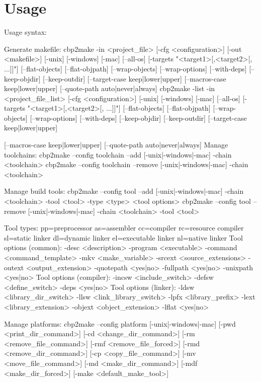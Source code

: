 \hypertarget{index_sec_usage}{}\section{Usage}\label{index_sec_usage}
{\ttfamily  
\begin{DoxyVerbInclude}
Usage syntax:

	Generate makefile:
		cbp2make -in <project_file> [-cfg <configuration>] [-out <makefile>]
			 [-unix] [-windows] [-mac] [--all-os] [-targets "<target1>[,<target2>[, ...]]"]
			 [--flat-objects] [--flat-objpath] [--wrap-objects] [--wrap-options]
			 [--with-deps] [--keep-objdir] [--keep-outdir] [--target-case keep|lower|upper]
			 [--macros-case keep|lower|upper] [--quote-path auto|never|always]
		cbp2make -list -in <project_file_list> [-cfg <configuration>]
			 [-unix] [-windows] [-mac] [--all-os] [-targets "<target1>[,<target2>[, ...]]"]
			 [--flat-objects] [--flat-objpath] [--wrap-objects] [--wrap-options]
			 [--with-deps] [--keep-objdir] [--keep-outdir] [--target-case keep|lower|upper]

			 [--macros-case keep|lower|upper] [--quote-path auto|never|always]
	Manage toolchains:
		cbp2make --config toolchain --add [-unix|-windows|-mac] -chain <toolchain>
		cbp2make --config toolchain --remove [-unix|-windows|-mac] -chain <toolchain>

	Manage build tools:
		cbp2make --config tool --add [-unix|-windows|-mac] -chain <toolchain>
			 -tool <tool> -type <type> <tool options>
		cbp2make --config tool --remove [-unix|-windows|-mac] -chain <toolchain>
			 -tool <tool>

	Tool types:	 pp=preprocessor as=assembler cc=compiler rc=resource compiler
			 sl=static linker dl=dynamic linker el=executable linker
			 nl=native linker
	Tool options (common):
			 -desc <description> -program <executable> -command <command_template>
			 -mkv <make_variable> -srcext <source_extensions> -outext <output_extension>
			 -quotepath <yes|no> -fullpath <yes|no> -unixpath <yes|no>
	Tool options (compiler):
			 -incsw <include_switch> -defsw <define_switch> -deps <yes|no>
	Tool options (linker):
			 -ldsw <library_dir_switch> -llsw <link_library_switch> -lpfx <library_prefix>
			 -lext <library_extension> -objext <object_extension> -lflat <yes|no>

	Manage platforms:
		cbp2make --config platform [-unix|-windows|-mac] [-pwd <print_dir_command>]
			 [-cd <change_dir_command>] [-rm <remove_file_command>]
			 [-rmf <remove_file_forced>] [-rmd <remove_dir_command>]
			 [-cp <copy_file_command>] [-mv <move_file_command>]
			 [-md <make_dir_command>] [-mdf <make_dir_forced>]
			 [-make <default_make_tool>]


\end{DoxyVerbInclude}}
